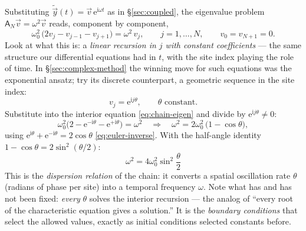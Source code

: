 \documentclass[11pt]{article}
\theoremstyle{plain}
\theoremstyle{definition}
\theoremstyle{remark}
\newcommand{\ee}{\mathrm{e}}
\newcommand{\ii}{\mathrm{i}}
\newcommand{\mA}{\mathsf{A}}
\begin{document}
Substituting $\tilde{\vec y}(t) = \vec v\,\ee^{\ii\omega t}$ as in
\S\ref{sec:coupled}, the eigenvalue problem
$\mA_N \vec v = \omega^2 \vec v$ reads, component by component,
\begin{equation}
  \omega_0^2\,\bigl(2v_j - v_{j-1} - v_{j+1}\bigr) = \omega^2\, v_j,
  \qquad j = 1,\dots,N,
  \qquad v_0 = v_{N+1} = 0 .
  \label{eq:chain-eigen}
\end{equation}
Look at what this is: a \emph{linear recursion in $j$ with constant
coefficients} --- the same structure our differential equations had in $t$,
with the site index playing the role of time. In \S\ref{sec:complex-method}
the winning move for such equations was the exponential ansatz; try its
discrete counterpart, a geometric sequence in the site index:
\begin{equation}
  v_j = \ee^{\ii j\theta},
  \qquad \theta \text{ constant}.
\end{equation}
Substitute into the interior equation \eqref{eq:chain-eigen} and divide by
$\ee^{\ii j\theta}\neq 0$:
\begin{equation}
  \omega_0^2\bigl(2 - \ee^{-\ii\theta} - \ee^{+\ii\theta}\bigr) = \omega^2
  \quad\Longrightarrow\quad
  \omega^2 = 2\omega_0^2\,\bigl(1 - \cos\theta\bigr),
\end{equation}
using $\ee^{\ii\theta}+\ee^{-\ii\theta} = 2\cos\theta$
\eqref{eq:euler-inverse}. With the half-angle identity
$1-\cos\theta = 2\sin^2(\theta/2)$:
\begin{equation}
  \boxed{\;
  \omega^2 = 4\omega_0^2 \sin^2\!\frac{\theta}{2}
  \;}
  \label{eq:dispersion}
\end{equation}
This is the \emph{dispersion relation} of the chain: it converts a spatial
oscillation rate $\theta$ (radians of phase per site) into a temporal
frequency $\omega$. Note what has and has not been fixed: \emph{every}
$\theta$ solves the interior recursion --- the analog of ``every root of the
characteristic equation gives a solution.'' It is the \emph{boundary
conditions} that select the allowed values, exactly as initial conditions
selected constants before.
\end{document}
